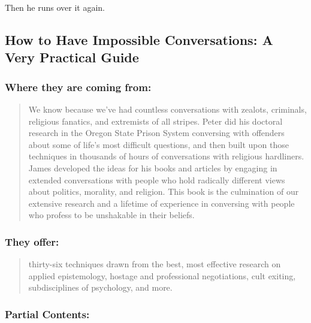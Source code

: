 \documentclass[10pt,titlepage]{book}
\begin{document}
Then he runs over it again.

\subsection{How to Have Impossible Conversations: A Very Practical Guide\cite{boghossian-conversations}}

\cite{boghossian-manual}

\subsubsection{Where they are coming from:}

\begin{quote}
  We know because we’ve had countless conversations with zealots, criminals, religious fanatics, and extremists of all stripes.
  Peter did his doctoral research in the Oregon State Prison System conversing with offenders about some of life’s most difficult questions, and then built upon those techniques in thousands of hours of conversations with religious hardliners.
  James developed the ideas for his books and articles by engaging in extended conversations with people who hold radically different views about politics, morality, and religion.
  This book is the culmination of our extensive research and a lifetime of experience in conversing with people who profess to be unshakable in their beliefs.
\end{quote}

\subsubsection{They offer:}

\begin{quote}
thirty-six techniques drawn from the best, most effective research on applied epistemology, hostage and professional negotiations, cult exiting, subdisciplines of psychology, and more.
\end{quote}

\subsubsection{Partial Contents:}
\end{document}
